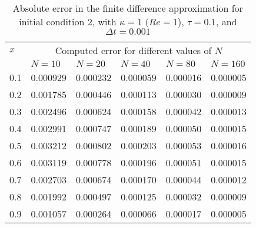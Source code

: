 \documentclass[undefended]{sfuthesis}
\begin{document}
\begin{table}[!h]%
	\centering
	\begin{threeparttable}
		\caption{Absolute error in the finite difference approximation for initial condition 2, with $\kappa = 1$ ($Re = 1$), $\tau = 0.1$, and $\Delta t = 0.001$}
		\begin{tabular}{p{.13\linewidth} p{.15\linewidth} p{.15\linewidth} p{.15\linewidth} p{.15\linewidth} p{.1\linewidth}}
			\toprule
			$x$ & \multicolumn{5}{c}{Computed error for different values of $N$} \\
			\cmidrule{2-6}
			& $N = 10$ & $N = 20$ & $N = 40$ & $N = 80$ & $N = 160$ \\
			\midrule
			0.1 & 0.000929 & 0.000232 & 0.000059 & 0.000016 & 0.000005 \\
			0.2 & 0.001785 & 0.000446 & 0.000113 & 0.000030 & 0.000009 \\
			0.3 & 0.002496 & 0.000624 & 0.000158 & 0.000042 & 0.000013 \\
			0.4 & 0.002991 & 0.000747 & 0.000189 & 0.000050 & 0.000015 \\
			0.5 & 0.003212 & 0.000802 & 0.000203 & 0.000053 & 0.000016 \\
			0.6 & 0.003119 & 0.000778 & 0.000196 & 0.000051 & 0.000015 \\
			0.7 & 0.002703 & 0.000674 & 0.000170 & 0.000044 & 0.000012 \\
			0.8 & 0.001992 & 0.000497 & 0.000125 & 0.000032 & 0.000009 \\
			0.9 & 0.001057 & 0.000264 & 0.000066 & 0.000017 & 0.000005 \\
			\bottomrule
		\end{tabular}
	\end{threeparttable}
\end{table}
\end{document}
